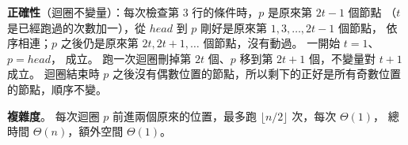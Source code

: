 \begin{pastsoln}
\textbf{正確性}（迴圈不變量）：每次檢查第 3 行的條件時，$p$ 是原來第 $2t - 1$ 個節點
（$t$ 是已經跑過的次數加一），從 $\mathit{head}$ 到 $p$ 剛好是原來第 $1, 3, \ldots, 2t - 1$ 個節點，
依序相連；$p$ 之後仍是原來第 $2t, 2t + 1, \ldots$ 個節點，沒有動過。 一開始 $t = 1$、$p = \mathit{head}$，
成立。 跑一次迴圈刪掉第 $2t$ 個、$p$ 移到第 $2t + 1$ 個，不變量對 $t + 1$ 成立。 迴圈結束時
$p$ 之後沒有偶數位置的節點，所以剩下的正好是所有奇數位置的節點，順序不變。

\textbf{複雜度}。 每次迴圈 $p$ 前進兩個原來的位置，最多跑 $\lfloor n/2 \rfloor$ 次，每次 $\Theta(1)$，
總時間 $\Theta(n)$，額外空間 $\Theta(1)$。
\end{pastsoln}
